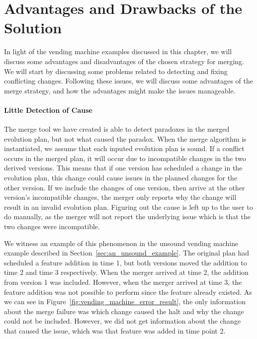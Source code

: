 \documentclass[a4paper,english]{ifimaster}
\begin{document}
\section{Advantages and Drawbacks of the Solution}%
\label{sec:advantages_and_drawbacks_of_the_solution}

In light of the vending machine examples discussed in this chapter, we will discuss some advantages and disadvantages of the chosen strategy for merging. We will start by discussing some problems related to detecting and fixing conflicting changes. Following these issues, we will discuss some advantages of the merge strategy, and how the advantages might make the issues manageable.

\paragraph{Little Detection of Cause}%
\label{par:little_detection_of_cause}

The merge tool we have created is able to detect paradoxes in the merged evolution plan, but not what caused the paradox. When the merge algorithm is instantiated, we assume that each inputed evolution plan is sound. If a conflict occurs in the merged plan, it will occur due to incompatible changes in the two derived versions. This means that if one version has scheduled a change in the evolution plan, this change could cause issues in the planned changes for the other version. If we include the changes of one version, then arrive at the other version's incompatible changes, the merger only reports why the change will result in an invalid evolution plan. Figuring out the cause is left up to the user to do manually, as the merger will not report the underlying issue which is that the two changes were incompatible.

We witness an example of this phenomenon in the unsound vending machine example described in Section~\vref{sec:an_unsound_example}. The original plan had scheduled a feature addition in time 1, but both versions moved the addition to time 2 and time 3 respectively. When the merger arrived at time 2, the addition from version 1 was included. However, when the merger arrived at time 3, the feature addition was not possible to perform since the feature already existed. As we can see in Figure~\vref{fig:vending_machine_error_result}, the only information about the merge failure was which change caused the halt and why the change could not be included. However, we did not get information about the change that caused the issue, which was that feature was added in time point 2.
\end{document}
